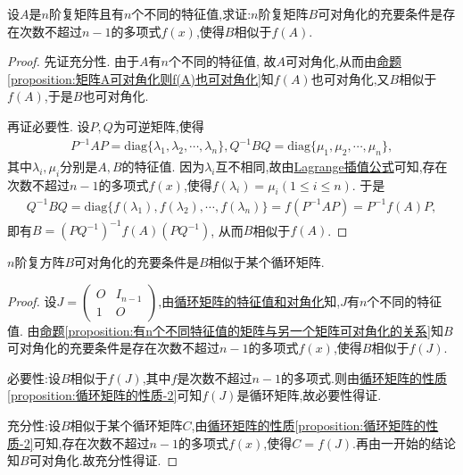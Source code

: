 \documentclass[../../main.tex]{subfiles}%
\begin{document}
\begin{proposition}\label{proposition:有n个不同特征值的矩阵与另一个矩阵可对角化的关系}
设$A$是$n$阶复矩阵且有$n$个不同的特征值,求证:$n$阶复矩阵$B$可对角化的充要条件是存在次数不超过$n - 1$的多项式$f(x)$,使得$B$相似于$f(A)$.
\end{proposition}
\begin{proof}

先证充分性. 由于$A$有$n$个不同的特征值, 故$A$可对角化,从而由\hyperref[proposition:矩阵A可对角化则f(A)也可对角化]{命题\ref{proposition:矩阵A可对角化则f(A)也可对角化}}知$f(A)$也可对角化,又$B$相似于$f(A)$,于是$B$也可对角化. 

再证必要性. 设$P,Q$为可逆矩阵,使得
\begin{align*}
P^{-1}AP=\mathrm{diag}\{\lambda_1,\lambda_2,\cdots,\lambda_n\}, Q^{-1}BQ=\mathrm{diag}\{\mu_1,\mu_2,\cdots,\mu_n\},
\end{align*}
其中$\lambda_i,\mu_i$分别是$A,B$的特征值. 因为$\lambda_i$互不相同,故由\hyperref[theorem:Lagrange插值公式]{Lagrange插值公式}可知,存在次数不超过$n - 1$的多项式$f(x)$,使得$f(\lambda_i)=\mu_i(1\leqslant  i\leqslant  n)$. 于是
\begin{align*}
Q^{-1}BQ=\mathrm{diag}\{f(\lambda_1),f(\lambda_2),\cdots,f(\lambda_n)\}=f(P^{-1}AP)=P^{-1}f(A)P,
\end{align*}
即有$B=(PQ^{-1})^{-1}f(A)(PQ^{-1})$, 从而$B$相似于$f(A)$. 
\end{proof}

\begin{corollary}\label{corollary:}
$n$阶复方阵$B$可对角化的充要条件是$B$相似于某个循环矩阵.
\end{corollary}
\begin{proof}

设$J=\begin{pmatrix}O&I_{n - 1}\\1&O\end{pmatrix}$,由\hyperref[proposition:循环矩阵的特征值和对角化]{循环矩阵的特征值和对角化}知,$J$有$n$个不同的特征值. 由\hyperref[proposition:有n个不同特征值的矩阵与另一个矩阵可对角化的关系]{命题\ref{proposition:有n个不同特征值的矩阵与另一个矩阵可对角化的关系}}知$B$可对角化的充要条件是存在次数不超过$n-1$的多项式$f(x)$,使得$B$相似于$f(J)$.

{\heiti 必要性:}设$B$相似于$f(J)$,其中$f$是次数不超过$n-1$的多项式.则由\hyperref[proposition:循环矩阵的性质]{循环矩阵的性质\ref{proposition:循环矩阵的性质-2}}可知$f(J)$是循环矩阵,故必要性得证.

{\heiti 充分性:}设$B$相似于某个循环矩阵$C$,由\hyperref[proposition:循环矩阵的性质]{循环矩阵的性质\ref{proposition:循环矩阵的性质-2}}可知,存在次数不超过$n - 1$的多项式$f(x)$,使得$C = f(J)$.再由一开始的结论知$B$可对角化.故充分性得证.
\end{proof}
\end{document}

